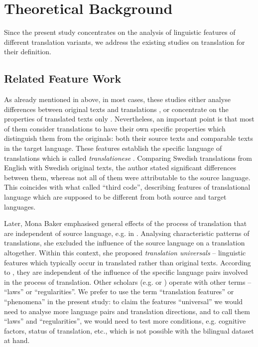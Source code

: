 \documentclass[output=paper]{LSP/langsci}
\begin{document}
\section{Theoretical Background} \label{sec:4:2}

Since the present study concentrates on the analysis of linguistic features of different translation variants, we address the existing studies on translation for their definition.

\subsection{Related Feature Work}

As already mentioned in  above, in most cases, these studies either analyse differences between original texts and translations \citep{House1997,Matthiessen2001,Teich2003,Hansen2003,Steiner2004}, or concentrate on the properties of translated texts only \citep{Baker1995}. Nevertheless, an important point is that most of them consider translations to have their own specific properties which distinguish them from the originals: both their source texts and comparable texts in the target language. These features establish the specific language of translations which is called \textit{translationese} \citep{Gellerstam1986}. Comparing Swedish translations from English with Swedish original texts, the author stated signiﬁcant differences between them, whereas not all of them were attributable to the source language. This coincides with what \citet{Frawley1984} called “third code”, describing features of translational language which are supposed to be different from both source and target languages.

Later, Mona Baker emphasised general effects of the process of translation that are independent of source language, e.g. in \citet{Baker1993,Baker1995}. Analysing characteristic patterns of translations, she excluded the influence of the source language on a translation altogether. Within this context, she proposed \textit{translation universals} – linguistic features which typically occur in translated rather than original texts. According to \citet{Baker1993}, they are independent of the influence of the specific language pairs involved in the process of translation. Other scholars (e.g. \citealt{Toury1995} or \citealt{Chesterman2004}) operate with other terms -- “laws” or “regularities”. We prefer to use the term “translation features” or “phenomena” in the present study: to claim the features “universal” we would need to analyse more language pairs and translation directions, and to call them “laws” and “regularities”, we would need to test more conditions, e.g. cognitive factors, status of translation, etc., which is not possible with the bilingual dataset at hand.
\end{document}
